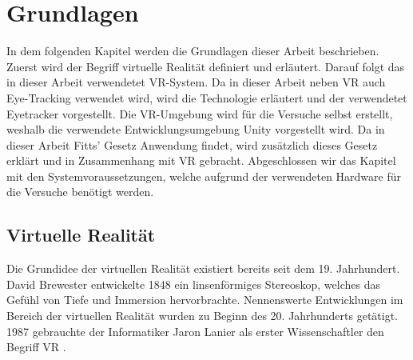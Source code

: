 
\chapter{Grundlagen}
In dem folgenden Kapitel werden die Grundlagen dieser Arbeit beschrieben. Zuerst wird der Begriff virtuelle Realität definiert und erläutert. Darauf folgt das in dieser Arbeit verwendetet \ac{VR}-System. Da in dieser Arbeit neben \ac{VR} auch Eye-Tracking verwendet wird, wird die Technologie erläutert und der verwendetet Eyetracker vorgestellt. Die \ac{VR}-Umgebung wird für die Versuche selbst erstellt, weshalb die verwendete Entwicklungsumgebung Unity vorgestellt wird. Da in dieser Arbeit Fitts' Gesetz Anwendung findet, wird zusätzlich dieses Gesetz erklärt und in Zusammenhang mit \ac{VR} gebracht. Abgeschlossen wir das Kapitel mit den Systemvoraussetzungen, welche aufgrund der verwendeten Hardware für die Versuche benötigt werden.

\section{Virtuelle Realität}
Die Grundidee der virtuellen Realität existiert bereits seit dem 19. Jahrhundert. David Brewester entwickelte 1848 ein linsenförmiges Stereoskop, welches das Gefühl von Tiefe und Immersion hervorbrachte. Nennenswerte Entwicklungen im Bereich der virtuellen Realität wurden zu Beginn des 20. Jahrhunderts getätigt. \cite{Singh.2017} 1987 gebrauchte der Informatiker Jaron Lanier als erster Wissenschaftler den Begriff \ac{VR} \cite{Doerner2019}. 

